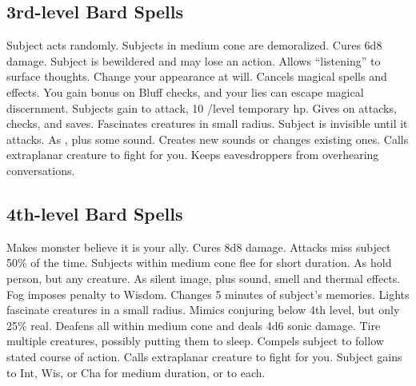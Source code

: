 \subsection{3rd-level Bard Spells}
\begin{spelllist}
   Subject acts randomly.
   Subjects in medium cone are demoralized.
   Cures 6d8 damage.
   Subject is bewildered and may lose an action.
   Allows ``listening'' to surface thoughts.
   Change your appearance at will.
   Cancels magical spells and effects.
   You gain  bonus on Bluff checks, and your lies can escape magical discernment.
   Subjects gain  to attack, 10 /level temporary hp.
   Gives  on attacks, checks, and saves.
   Fascinates creatures in small radius.
   Subject is invisible until it attacks.
   As , plus some sound.
   Creates new sounds or changes existing ones.
   Calls extraplanar creature to fight for you.
   Keeps eavesdroppers from overhearing conversations.
\end{spelllist}

\subsection{4th-level Bard Spells}
\begin{spelllist} 
   Makes monster believe it is your ally.
   Cures 8d8 damage.
   Attacks miss subject 50\% of the time.
   Subjects within medium cone flee for short duration.
   As hold person, but any creature.
   As silent image, plus sound, smell and thermal effects.
   Fog imposes  penalty to Wisdom.
   Changes 5 minutes of subject's memories.
   Lights fascinate creatures in a small radius.
   Mimics conjuring below 4th level, but only 25\% real.
   Deafens all within medium cone and deals 4d6 sonic damage.
   Tire multiple creatures, possibly putting them to sleep.
   Compels subject to follow stated course of action.
   Calls extraplanar creature to fight for you.
   Subject gains  to Int, Wis, or Cha for medium duration, or  to each.%
\end{spelllist}

